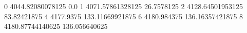 0 4044.82080078125 0.0
1 4071.57861328125 26.7578125
2 4128.64501953125 83.82421875
4 4177.9375 133.11669921875
6 4180.984375 136.16357421875
8 4180.87744140625 136.056640625
